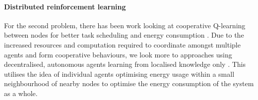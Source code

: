 \paragraph{Distributed reinforcement learning}
For the second problem, there has been work looking at cooperative Q-learning between nodes for better task scheduling and energy consumption \citep{doi:10.1155/2014/765182}. Due to the increased resources and computation required to coordinate amongst multiple agents and form cooperative behaviours, we look more to approaches using decentralised, autonomous agents learning from localised knowledge only \citep{10.1007/978-3-642-11814-2_4}.  This utilises the idea of individual agents optimising energy usage within a small neighbourhood of nearby nodes to optimise the energy consumption of the system as a whole. 

